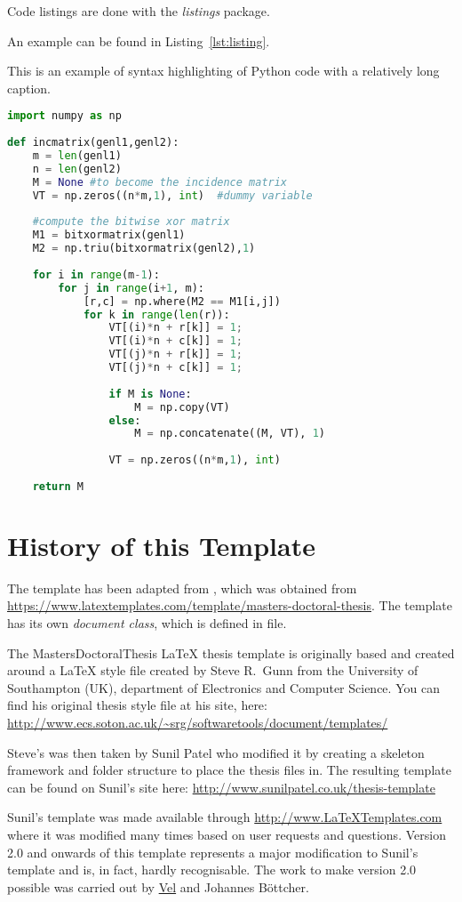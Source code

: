 Code listings are done with the \emph{listings} package.

An example can be found in Listing~\ref{lst:listing}.

\begin{lstfloat}
\caption{\label{lst:listing} This is an example of syntax highlighting of Python code with a relatively long caption.}
\begin{lstlisting}[language=Python]
import numpy as np
 
def incmatrix(genl1,genl2):
    m = len(genl1)
    n = len(genl2)
    M = None #to become the incidence matrix
    VT = np.zeros((n*m,1), int)  #dummy variable
 
    #compute the bitwise xor matrix
    M1 = bitxormatrix(genl1)
    M2 = np.triu(bitxormatrix(genl2),1) 
 
    for i in range(m-1):
        for j in range(i+1, m):
            [r,c] = np.where(M2 == M1[i,j])
            for k in range(len(r)):
                VT[(i)*n + r[k]] = 1;
                VT[(i)*n + c[k]] = 1;
                VT[(j)*n + r[k]] = 1;
                VT[(j)*n + c[k]] = 1;
 
                if M is None:
                    M = np.copy(VT)
                else:
                    M = np.concatenate((M, VT), 1)
 
                VT = np.zeros((n*m,1), int)
 
    return M
\end{lstlisting}
\end{lstfloat}

\section{History of this Template}
The template has been adapted from , which was obtained from \url{https://www.latextemplates.com/template/masters-doctoral-thesis}. The template has its own \emph{document class}, which is defined in  file.

The MastersDoctoralThesis LaTeX thesis template is originally based and created around a LaTeX style file created by Steve R.\ Gunn from the University of Southampton (UK), department of Electronics and Computer Science. You can find his original thesis style file at his site, here:
\url{http://www.ecs.soton.ac.uk/~srg/softwaretools/document/templates/}

Steve's  was then taken by Sunil Patel who modified it by creating a skeleton framework and folder structure to place the thesis files in. The resulting template can be found on Sunil's site here:
\url{http://www.sunilpatel.co.uk/thesis-template}

Sunil's template was made available through \url{http://www.LaTeXTemplates.com} where it was modified many times based on user requests and questions. Version 2.0 and onwards of this template represents a major modification to Sunil's template and is, in fact, hardly recognisable. The work to make version 2.0 possible was carried out by \href{mailto:vel@latextemplates.com}{Vel} and Johannes Böttcher.
